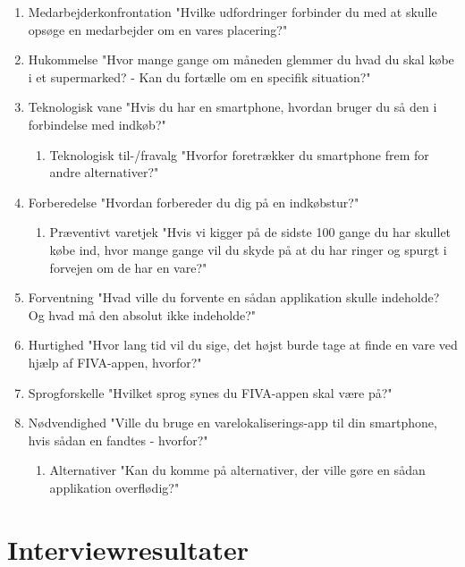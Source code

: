 \documentclass[12pt]{article}
\begin{document}
\begin{enumerate}
\item Medarbejderkonfrontation "Hvilke udfordringer forbinder du med at skulle opsøge en medarbejder om en vares placering?"
\item Hukommelse "Hvor mange gange om måneden glemmer du hvad du skal købe i et supermarked? - Kan du fortælle om en specifik situation?"
\item Teknologisk vane "Hvis du har en smartphone, hvordan bruger du så den i forbindelse med indkøb?"

\begin{enumerate}
\item Teknologisk til-/fravalg "Hvorfor foretrækker du smartphone frem for andre alternativer?"
\end{enumerate}

\item Forberedelse "Hvordan forbereder du dig på en indkøbstur?"

\begin{enumerate}
\item Præventivt varetjek "Hvis vi kigger på de sidste 100 gange du har skullet købe ind, hvor mange gange vil du skyde på at du har ringer og spurgt i forvejen om de har en vare?"
\end{enumerate}

\item Forventning "Hvad ville du forvente en sådan applikation skulle indeholde? Og hvad må den absolut ikke indeholde?"
\item Hurtighed	"Hvor lang tid vil du sige, det højst burde tage at finde en vare ved hjælp af FIVA-appen, hvorfor?"
\item Sprogforskelle "Hvilket sprog synes du FIVA-appen skal være på?"
\item Nødvendighed "Ville du bruge en varelokaliserings-app til din smartphone, hvis sådan en fandtes - hvorfor?"

\begin{enumerate}
\item Alternativer "Kan du komme på alternativer, der ville gøre en sådan applikation overflødig?"
\end{enumerate}

\end{enumerate}

\section{Interviewresultater}
\end{document}
